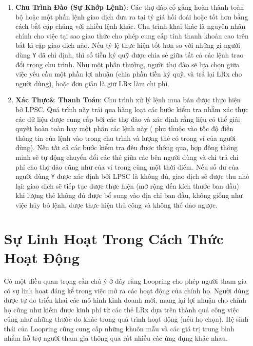 \documentclass{article}
\makeatletter
\newenvironment{figurehere}
 {\def\@captype{figure}}
 {}
\makeatother
\begin{document}
\begin{multicols}{2}
\begin{enumerate}
\item \textbf{Chu Trình Đào (Sự Khớp Lệnh)}:  Các thợ đào cố gắng hoàn thành toàn bộ hoặc một phần lệnh giao dịch đưa ra tại tỷ giá hối đoái hoặc tốt hơn bằng cách bắt cặp chúng với nhiều lệnh khác. Chu trình khai thác là nguyên nhân chính cho việc tại sao giao thức cho phép cung cấp tính thanh khoản cao trên bất kì cặp giao dịch nào. Nếu tỷ lệ thực hiện tốt hơn so với những gì người dùng \verb|Y| đã chỉ định, thì số tiền ký quỹ được chia sẻ giữa tất cả các lệnh trao đổi trong chu trình. Như một phần thưởng, người thợ đào sẽ lựa chọn giữa việc yêu cầu một phần lợi nhuận (chia phần tiền ký quỹ, và trả lại LRx cho người dùng), hoặc đơn giản là giữ LRx làm chi phí.

\item \textbf{Xác Thực\& Thanh Toán}: Chu trình xử lý lệnh mua bán được thực hiện bở LPSC. Quá trình này trải qua hàng loạt các bước kiểm tra nhằm xác thực các dữ liệu được cung cấp bởi các thợ đào và xác định rằng liệu có thể giải quyết hoàn toàn hay một phần các lệnh này ( phụ thuộc vào tốc độ điền thông tin của lệnh vào trong chu trình và lượng thẻ có trong ví của người dùng). Nếu tất cả các bước kiểm tra đều được thông qua, hợp đồng thông minh sẽ tự động chuyển đổi các thẻ giữa các bên người dùng và chi trả chi phí cho thợ đào cũng như của ví trong cùng một thời điểm. Nếu số dư của người dùng \verb|Y| được xác định bởi LPSC là không đủ, giao dịch sẽ được thu nhỏ lại: giao dịch sẽ tiếp tục được thực hiện (mở rộng đến kích thước ban đầu) khi lượng thẻ không đủ được bổ sung vào địa chỉ ban đầu, không giống như việc hủy bỏ lệnh, được thực hiện thủ công và không thể đảo ngược.


\end{enumerate}





%
%
%

\section{Sự Linh Hoạt Trong Cách Thức Hoạt Động\label{sec:business_model}}
Có một điều quan trọng cần chú ý ở đây rằng Loopring cho phép người tham gia có sự linh hoạt đáng kể trong việc mở ra các hoạt động của chính họ. Người dùng được tự do triển khai các mô hình kinh doanh mới, mang lại lợi nhuận cho chính họ cũng như kiếm được kinh phí từ các thẻ LRx dựa trên thành quả công việc cũng như những thước đo khác trong quá trình hoạt động (nếu họ chọn). Hệ sinh thái của Loopring cũng cung cấp những khuôn mẫu và các giá trị trung bình nhằm hỗ trợ người tham gia thông qua rất nhiều các ứng dụng khác nhau.



\end{multicols}
\end{document}
